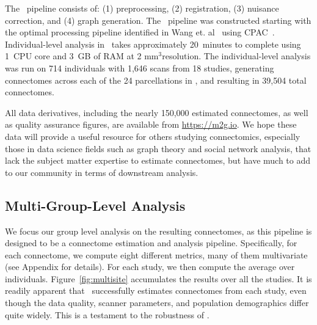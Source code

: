 \documentclass[11pt]{article}
\begin{document}
\begin{multicols}{2}
The \ndmgf~pipeline consists of: (1) preprocessing, (2) registration, (3) nuisance correction, and (4) graph generation.
The \ndmgf~pipeline was constructed starting with the optimal processing pipeline identified in Wang et. al~\cite{discriminability} using CPAC~\cite{cpac}. 
Individual-level analysis in \ndmgf~takes approximately 20~minutes to complete using 1~CPU core and 3~GB of RAM at 2 mm$^3$resolution.
The individual-level analysis was run on 714 individuals with 1,646 scans from 18 studies, generating connectomes across each of the 24 parcellations in \ndmgd, and resulting in 39,504 total connectomes.

All data derivatives, including the nearly 150,000 estimated connectomes, as well as quality assurance figures, are available from \url{https://m2g.io}.  We hope these data will provide a useful resource for others studying connectomics, especially those in data science fields such as graph theory and social network analysis, that lack the subject matter expertise to estimate connectomes, but have much to add to our community in terms of downstream analysis.


\subsection{Multi-Group-Level Analysis}



We focus our group level analysis on the resulting connectomes, as this pipeline is designed to be a connectome estimation and analysis pipeline.  Specifically, for each connectome, we compute eight different metrics, many of them multivariate (see Appendix for details).  For each study, we then compute the average over individuals.  Figure~\ref{fig:multisite} accumulates the results over all the studies.  It is readily apparent that \ndmg~successfully estimates connectomes from each study, even though the data quality, scanner parameters, and population demographics differ quite widely.  This is a testament to the robustness of \ndmg.  



\end{multicols}
\end{document}
